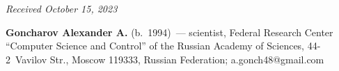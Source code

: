 \vspace*{-8pt}

\hfill{\small\textit{Received October 15, 2023}} 

\vspace*{-18pt}

\Contrl

\vspace*{-4pt}

\noindent
\textbf{Goncharov Alexander A.} (b.\ 1994)~--- scientist, Federal Research Center ``Computer 
Science and Control'' of the Russian Academy of Sciences, 44-2~Vavilov Str., Moscow 119333, 
Russian Federation; \mbox{a.gonch48@gmail.com}

\label{end\stat}

\renewcommand{\bibname}{\protect\rm Литература} 